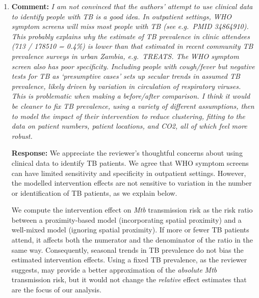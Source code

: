 \documentclass[11pt]{article}
\newcommand{\comment}[1]{\textbf{Comment:} \textit{#1}}
\newcommand{\response}[1]{\textbf{Response:} #1}
\begin{document}
\begin{enumerate}[label=\textbf{R2.\arabic*.}, leftmargin=*]
{Nevertheless, we agree with the reviewer that the original claim of ``a significant public health impact'' was probably too strong given that these are modelled, not empirical, results. We have attenuated the language throughout the manuscript to make clear that these are estimated potential benefits, not direct evidence of prevented infections (see \ref{r:2.1} for a detailed list of changes).}

\item\label{r:2.8} \comment{I am not convinced that the authors' attempt to use clinical data to identify people with TB is a good idea. In outpatient settings, WHO symptom screens will miss most people with TB (see e.g.\ PMID 34864910). This probably explains why the estimate of TB prevalence in clinic attendees (713 / 178510 = 0.4\%) is lower than that estimated in recent community TB prevalence surveys in urban Zambia, e.g.\ TREATS. The WHO symptom screen also has poor specificity. Including people with cough/fever but negative tests for TB as `presumptive cases' sets up secular trends in assumed TB prevalence, likely driven by variation in circulation of respiratory viruses. This is problematic when making a before/after comparison. I think it would be cleaner to fix TB prevalence, using a variety of different assumptions, then to model the impact of their intervention to reduce clustering, fitting to the data on patient numbers, patient locations, and CO2, all of which feel more robust.}

\response{We appreciate the reviewer's thoughtful concerns about using clinical data to identify TB patients. We agree that WHO symptom screens can have limited sensitivity and specificity in outpatient settings. However, the modelled intervention effects are not sensitive to variation in the number or identification of TB patients, as we explain below.

We compute the intervention effect on \emph{Mtb} transmission risk as the risk ratio between a proximity-based model (incorporating spatial proximity) and a well-mixed model (ignoring spatial proximity). If more or fewer TB patients attend, it affects both the numerator and the denominator of the ratio in the same way. Consequently, seasonal trends in TB prevalence do not bias the estimated intervention effects. Using a fixed TB prevalence, as the reviewer suggests, may provide a better approximation of the \textit{absolute} \emph{Mtb} transmission risk, but it would not change the \textit{relative} effect estimates that are the focus of our analysis.

}
\end{enumerate}
\end{document}
